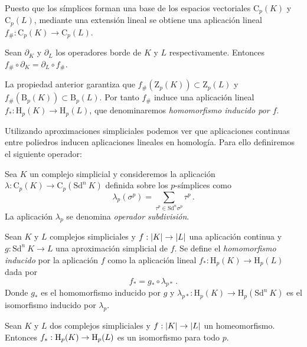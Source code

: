 Puesto que los símplices forman una base de los espacios vectoriales $\text{C}_p(K)$ y $\text{C}_p(L)$, mediante una extensión lineal se obtiene una aplicación lineal $f_{\#}: \text{C}_p(K) \to \text{C}_p(L)$.

\begin{property}
Sean $\partial_K$ y $\partial_L$ los operadores borde de $K$ y $L$ respectivamente. Entonces $f_{\#}\circ \partial_K = \partial_L \circ f_{\#}$.
\end{property}
La propiedad anterior garantiza que $f_{\#}(\text{Z}_p(K)) \subset \text{Z}_p(L)$ y $f_{\#}(\text{B}_p(K)) \subset \text{B}_p(L)$. Por tanto $f_{\#}$ induce una aplicación lineal $f_{*}: \text{H}_p(K) \to \text{H}_p(L)$, que denominaremos \emph{homomorfismo inducido por $f$}.

Utilizando aproximaciones simpliciales podemos ver que aplicaciones continuas entre poliedros inducen aplicaciones lineales en homología. Para ello definiremos el siguiente operador:

\begin{definition}
\begin{sloppypar}
Sea $K$ un complejo simplicial y consideremos la aplicación ${\lambda: \text{C}_p(K) \to \text{C}_p(\text{Sd}^n\ K)}$ definida sobre los $p$-símplices como
\[
\lambda_p(\sigma^p) = \sum_{\tau^p \in \text{Sd}^n \sigma^p} \tau^p\,.
\]
La aplicación $\lambda_p$ se denomina \emph{operador subdivisión}.
\end{sloppypar} 
\end{definition}

\begin{sloppypar}
Sean $K$ y $L$ complejos simpliciales y ${f: \lvert K\rvert \to \lvert L\rvert}$ una aplicación continua y ${g: \text{Sd}^n\ K \to L}$ una aproximación simplicial de $f$. Se define el \emph{homomorfismo inducido} por la aplicación $f$ como la aplicación lineal ${f_{*}: \text{H}_p(K) \to \text{H}_p(L)}$ dada por
\[
f_{*} = g_{*} \circ \lambda_{p*}\,.
\]
Donde $g_{*}$ es el homomorfismo inducido por $g$ y ${\lambda_{p*}: \text{H}_p(K) \to \text{H}_p(\text{Sd}^n\ K)}$ es el isomorfismo inducido por $\lambda_p$.
\end{sloppypar}

\begin{theorem}\label{ref:teoremaHomomorfismoInducido}
Sean $K$ y $L$ dos complejos simpliciales y $f: \lvert K\rvert \to \lvert L\rvert$ un homeomorfismo. Entonces $f_{*}: \text{\rm H}_p(K) \to \text{\rm H}_p(L)$ es un isomorfismo para todo $p$.
\end{theorem}


